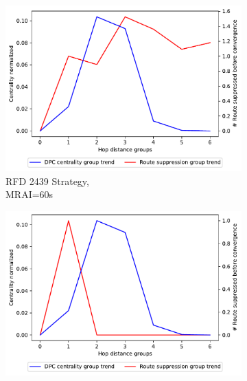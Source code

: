 \begin{figure}[H]
\begin{subfigure}[b]{0.325\textwidth}
         \label{fig:1000_7196RFDC_centVSsup_elephants}
     \end{subfigure}
     \vfill
     \begin{subfigure}[b]{0.325\textwidth}
         \centering
         \includegraphics[width=\textwidth]{images/RFD/miceVSelephants/MultiMRAI/60/elephants/cisco_1000_RFD_nodeConvergence_centVSsup_trend.pdf}
         \caption{RFD 2439 Strategy, \\MRAI=60s}
         \label{fig:1000_2439RFD_centVSsup_elephants}
     \end{subfigure}
     \hfill
     \begin{subfigure}[b]{0.325\textwidth}
         \centering
         \includegraphics[width=\textwidth]{images/RFD/miceVSelephants/MultiMRAI/60/elephants/cisco_1000_RFD_7196_aggressive_nodeConvergence_centVSsup_trend.pdf}

\end{subfigure}
\end{figure}
